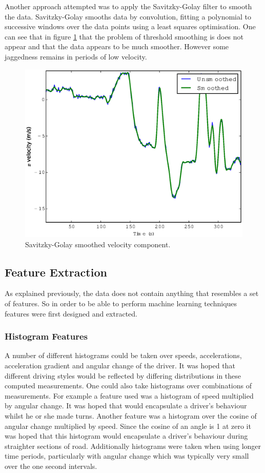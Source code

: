 \documentclass[a4paper, 11pt, twocolumn]{report}
\begin{document}
Another approach attempted was to apply the Savitzky-Golay filter to smooth the data.
Savitzky-Golay smooths data by convolution, fitting a polynomial to successive windows over the data points using a least squares optimisation.
One can see that in figure \ref{fig:savgolsmooth} that the problem of threshold smoothing is does not appear and that the data appears to be much smoother.
However some jaggedness remains in periods of low velocity.

\begin{figure}[h]
    \center
    \includegraphics[width=\linewidth]{img/savgolsmooth}
    \caption{Savitzky-Golay smoothed velocity component.}
    \label{fig:savgolsmooth}
\end{figure}
\subsection{Feature Extraction}
As explained previously, the data does not contain anything that resembles a set of features.
So in order to be able to perform machine learning techniques features were first designed and extracted.

\subsubsection{Histogram Features}
A number of different histograms could be taken over speeds, accelerations, acceleration gradient and angular change of the driver.
It was hoped that different driving styles would be reflected by differing distributions in these computed measurements.
One could also take histograms over combinations of measurements.
For example a feature used was a histogram of speed multiplied by angular change. It was hoped that would encapsulate a driver's behaviour whilst he or she made turns.
Another feature was a histogram over the cosine of angular change multiplied by speed.
Since the cosine of an angle is 1 at zero it was hoped that this histogram would encapsulate a driver's behaviour during straighter sections of road.
Additionally histograms were taken when using longer time periods, particularly with angular change which was typically very small over the one second intervals.
\end{document}
